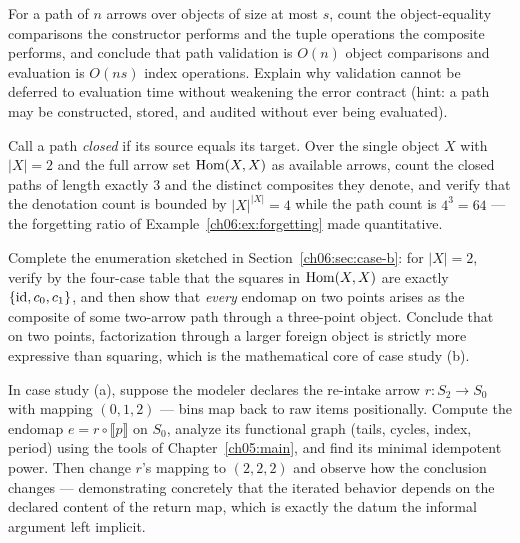 \begin{exercise}
\label{ch06:ex:adjacency}
For a path of $n$ arrows over objects of size at most $s$, count the
object-equality comparisons the constructor performs and the tuple
operations the composite performs, and conclude that path validation is
$O(n)$ object comparisons and evaluation is $O(n s)$ index operations.
Explain why validation cannot be deferred to evaluation time without
weakening the error contract (hint: a path may be constructed, stored, and
audited without ever being evaluated).
\end{exercise}

\begin{exercise}
\label{ch06:ex:closedcount}
Call a path \emph{closed} if its source equals its target. Over the
single object $X$ with $|X| = 2$ and the full arrow set
$\mathrm{Hom}(X, X)$ as available arrows, count the closed paths of length
exactly $3$ and the distinct composites they denote, and verify that the
denotation count is bounded by $|X|^{|X|} = 4$ while the path count is
$4^{3} = 64$ --- the forgetting ratio of
Example~\ref{ch06:ex:forgetting} made quantitative.
\end{exercise}

\begin{exercise}
\label{ch06:ex:square-roots}
Complete the enumeration sketched in Section~\ref{ch06:sec:case-b}:
for $|X| = 2$, verify by the four-case table that the squares in
$\mathrm{Hom}(X, X)$ are exactly $\{\mathrm{id}, c_0, c_1\}$, and then show that
\emph{every} endomap on two points arises as the composite of some
two-arrow path through a three-point object. Conclude that on two points,
factorization through a larger foreign object is strictly more expressive
than squaring, which is the mathematical core of case study (b).
\end{exercise}

\begin{exercise}
\label{ch06:ex:repair}
In case study (a), suppose the modeler declares the re-intake arrow
$r : S_2 \to S_0$ with mapping $(0, 1, 2)$ --- bins map back to raw items
positionally. Compute the endomap
$e = r \circ \llbracket p \rrbracket$ on $S_0$, analyze its functional
graph (tails, cycles, index, period) using the tools of
Chapter~\ref{ch05:main}, and find its minimal idempotent power. Then
change $r$'s mapping to $(2, 2, 2)$ and observe how the conclusion
changes --- demonstrating concretely that the iterated behavior depends
on the declared content of the return map, which is exactly the datum the
informal argument left implicit.
\end{exercise}


